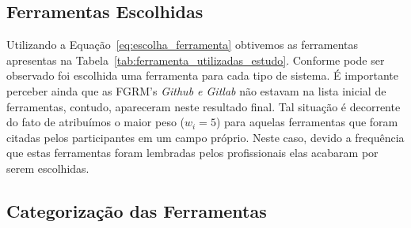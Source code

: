 \subsection{Ferramentas Escolhidas}
\label{subsec:resultados_ferramentas_escolhidas}

Utilizando a Equação~\ref{eq:escolha_ferramenta} obtivemos as ferramentas
apresentas na Tabela~\ref{tab:ferramenta_utilizadas_estudo}. Conforme pode ser
observado foi escolhida uma ferramenta para cada tipo de sistema. É importante
perceber ainda que as FGRM's \textit{Github e Gitlab} não estavam na lista
inicial de ferramentas, contudo, apareceram neste resultado final. Tal situação é
decorrente do fato de atribuímos o maior peso ($w_i = 5$) para aquelas
ferramentas que foram citadas pelos participantes em um campo próprio.  Neste
caso, devido a frequência que estas ferramentas foram lembradas pelos
profissionais elas acabaram por serem escolhidas. 

\begin{table}[htb]
\centering
\caption{Ferramentas utilizados no estudo}
\label{tab:ferramenta_utilizadas_estudo}
\end{table}


\subsection{Categorização das Ferramentas}
\label{subsec:categorizacao_ferramentas}

